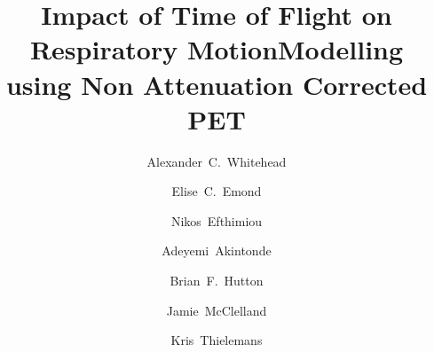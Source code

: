 \documentclass[portrait,color=UCLburgundy,margin=2cm]{uclposter}
\begin{document}
\title{Impact of Time of Flight on Respiratory Motion\newline Modelling using Non Attenuation Corrected PET}

\author[1,2 *]{Alexander~C.~Whitehead}
\author[1]{Elise~C.~Emond}
\author[3]{Nikos~Efthimiou}
\author[1,2]{Adeyemi~Akintonde}
\author[1]{Brian~F.~Hutton}
\author[2]{Jamie~McClelland}
\author[1]{Kris~Thielemans}


\maketitle
\end{document}
